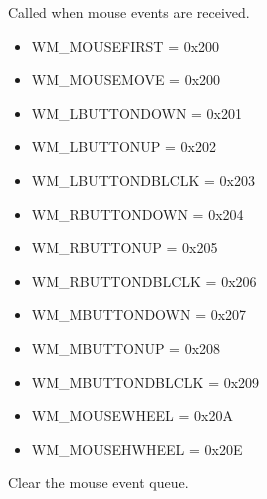 \documentclass[letterpaper,10pt,english]{sphinxmanual}
\begin{document}
\begin{fulllineitems}
\begin{fulllineitems}
\end{fulllineitems}


\begin{fulllineitems}
\label{threads:threads.inputcapture.INPUT_CAPTURE.on_mouse_event}
Called when mouse events are received.
\begin{itemize}
\item {} 
WM\_MOUSEFIRST = 0x200

\item {} 
WM\_MOUSEMOVE = 0x200

\item {} 
WM\_LBUTTONDOWN = 0x201

\item {} 
WM\_LBUTTONUP = 0x202

\item {} 
WM\_LBUTTONDBLCLK = 0x203

\item {} 
WM\_RBUTTONDOWN = 0x204

\item {} 
WM\_RBUTTONUP = 0x205

\item {} 
WM\_RBUTTONDBLCLK = 0x206

\item {} 
WM\_MBUTTONDOWN = 0x207

\item {} 
WM\_MBUTTONUP = 0x208

\item {} 
WM\_MBUTTONDBLCLK = 0x209

\item {} 
WM\_MOUSEWHEEL = 0x20A

\item {} 
WM\_MOUSEHWHEEL = 0x20E

\end{itemize}

\end{fulllineitems}


\begin{fulllineitems}
\label{threads:threads.inputcapture.INPUT_CAPTURE.reset_mouse_events}
Clear the mouse event queue.

\end{fulllineitems}


\end{fulllineitems}
\end{document}
